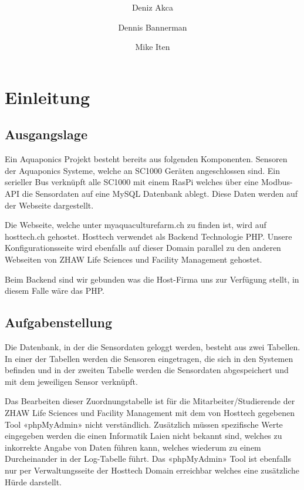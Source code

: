 \documentclass[a4paper]{article}
\author{
	Deniz Akca
	\and
	Dennis Bannerman
	\and
	Mike Iten
}
\affil{ZHAW - Zurich}
\title{
	\Huge{}\color{blue}\textbf{\project}\\ 
	\vspace{2cm}
	\large{}\color{black}\textbf{\outline}
}
\begin{document}
	\sloppy
	
	\begin{titlepage}
		\maketitle
		\thispagestyle{empty}
	\end{titlepage}
	
	\tableofcontents
	\newpage
	
	\fussy
	

		
	\section{Einleitung}
	
	\subsection{Ausgangslage}
	Ein Aquaponics Projekt besteht bereits aus folgenden Komponenten. Sensoren der Aquaponics Systeme, welche an SC1000 Geräten angeschlossen sind. 
	Ein serieller Bus verknüpft alle SC1000 mit einem RasPi welches über eine Modbus-API die Sensordaten auf eine MySQL Datenbank ablegt. Diese Daten werden auf der Webseite dargestellt.
	

	Die Webseite, welche unter myaquaculturefarm.ch zu finden ist, wird auf hosttech.ch gehostet. Hosttech verwendet als Backend Technologie PHP.
	Unsere Konfigurationsseite wird ebenfalls auf dieser Domain parallel zu den anderen Webseiten von ZHAW Life Sciences und Facility Management gehostet.
	
	Beim Backend sind wir gebunden was die Host-Firma uns zur Verfügung stellt, in diesem Falle wäre das PHP.
	
	\subsection{Aufgabenstellung}
	Die Datenbank, in der die Sensordaten geloggt werden, besteht aus zwei Tabellen. In einer der Tabellen werden die Sensoren eingetragen, die sich in den Systemen befinden und in der zweiten Tabelle werden die Sensordaten abgespeichert und mit dem jeweiligen Sensor verknüpft.
	
	Das Bearbeiten dieser Zuordnungstabelle ist für die Mitarbeiter/Studierende der ZHAW Life Sciences und Facility Management mit dem von Hosttech gegebenen Tool «phpMyAdmin» nicht verständlich. Zusätzlich müssen spezifische Werte eingegeben werden die einen Informatik Laien nicht bekannt sind, welches zu inkorrekte Angabe von Daten führen kann, welches wiederum zu einem Durcheinander in der Log-Tabelle führt. 
	Das «phpMyAdmin» Tool ist ebenfalls nur per Verwaltungsseite der Hosttech Domain erreichbar welches eine zusätzliche Hürde darstellt.
	
\end{document}
